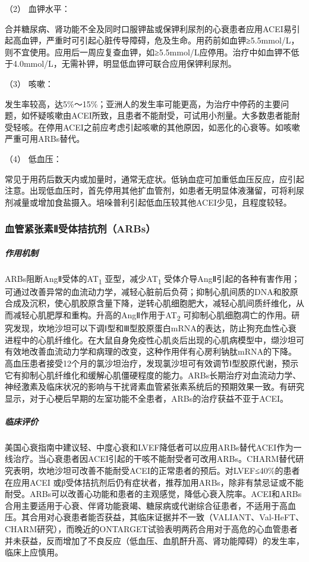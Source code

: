 \hypertarget{text00074.htmlux5cux23CHP3-3-3-2-2-4-2}{}
（2） 血钾水平：

合并糖尿病、肾功能不全及同时口服钾盐或保钾利尿剂的心衰患者应用ACEI易引起高血钾，严重时可引起心脏传导障碍，危及生命。用药前如血钾≥5.5mmol/L，则不宜使用。应用后一周应复查血钾，如≥5.5mmol/L应停用。治疗中如血钾不低于4.0mmol/L，无需补钾，明显低血钾可联合应用保钾利尿剂。

\hypertarget{text00074.htmlux5cux23CHP3-3-3-2-2-4-3}{}
（3） 咳嗽：

发生率较高，达5\%～15\%；亚洲人的发生率可能更高，为治疗中停药的主要问题，如怀疑咳嗽由ACEI所致，且患者不能耐受，可试用小剂量。大多数患者能耐受轻咳。在停用ACEI之前应考虑引起咳嗽的其他原因，如恶化的心衰等。如咳嗽严重可用ARBs替代。

\hypertarget{text00074.htmlux5cux23CHP3-3-3-2-2-4-4}{}
（4） 低血压：

常见于用药后数天内或加量时，通常无症状。低钠血症可加重低血压反应，应引起注意。出现低血压时，首先停用其他扩血管剂，如患者无明显体液潴留，可将利尿剂减量或增加食盐摄入。培哚普利引起低血压较其他ACEI少见，且程度较轻。

\subsubsection{血管紧张素Ⅱ受体拮抗剂（ARBs）}

\subparagraph{作用机制}

ARBs阻断AngⅡ受体的AT\textsubscript{1} 亚型，减少AT\textsubscript{1}
受体介导AngⅡ引起的各种有害作用；可通过改善异常的血流动力学，减轻心脏前后负荷；抑制心肌间质的DNA和胶原合成及沉积，使心肌胶原含量下降，逆转心肌细胞肥大，减轻心肌间质纤维化，从而减轻心肌肥厚和重构。升高的AngⅡ作用于AT\textsubscript{2}
可抑制心肌细胞凋亡的作用。研究发现，坎地沙坦可以下调Ⅰ型和Ⅲ型胶原蛋白mRNA的表达，防止狗充血性心衰进程中的心肌纤维化。在大鼠自身免疫性心肌炎后出现的心肌病模型中，缬沙坦可有效地改善血流动力学和病理的改变，这种作用伴有心房利钠肽mRNA的下降。高血压患者接受12个月的氯沙坦治疗，发现氯沙坦可有效调节Ⅰ型胶原代谢，预示它有抑制心肌纤维化和缓解心肌僵硬程度的能力。ARBs长期治疗对血流动力学、神经激素及临床状况的影响与干扰肾素血管紧张素系统后的预期效果一致。有研究显示，对于心梗后早期的左室功能不全患者，ARBs的治疗获益不亚于ACEI。

\subparagraph{临床评价}

美国心衰指南中建议轻、中度心衰和LVEF降低者可以应用ARBs替代ACEI作为一线治疗。当心衰患者因ACEI引起的干咳不能耐受者可改用ARBs。CHARM替代研究表明，坎地沙坦可改善不能耐受ACEI的正常患者的预后。对LVEF≤40\%的患者在应用ACEI
或β受体拮抗剂后仍有症状者，推荐加用ARBs，除非有禁忌证或不能耐受。ARBs可以改善心功能和患者的主观感觉，降低心衰入院率。ACEI和ARBs合用主要适用于心衰、伴肾功能衰竭、糖尿病或代谢综合征患者，不适用于高血压。其合用对心衰患者能否获益，其临床证据并不一致（VALIANT、Val-HeFT、CHARM研究），而晚近的ONTARGET试验表明两药合用对于高危的心血管患者并未获益，反而增加了不良反应（低血压、血肌酐升高、肾功能障碍）的发生率，临床上应慎用。

